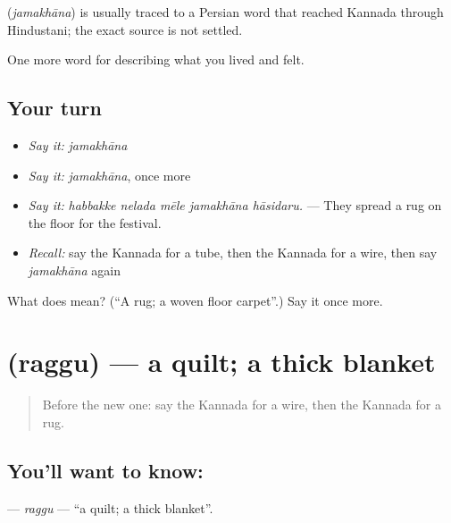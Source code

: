 \begin{cousinweb}
\textbf{} (\emph{jamakhāna}) is usually traced to a Persian word that reached Kannada through Hindustani; the exact source is not settled.
\end{cousinweb}

\begin{grammarlens}[title={What you've built}]
One more word for describing what you lived and felt.
\end{grammarlens}

\subsection*{Your turn}
\begin{itemize}
\raggedright
  \item \emph{Say it:} \emph{jamakhāna}
  \item \emph{Say it:} \emph{jamakhāna}, once more
  \item \emph{Say it:} \emph{habbakke nelada mēle jamakhāna hāsidaru.} — They spread a rug on the floor for the festival.
  \item \emph{Recall:} say the Kannada for a tube, then the Kannada for a wire, then say \emph{jamakhāna} again
\end{itemize}

\begin{tcolorbox}[breakable,colback=teal!4,colframe=teal!35!black,title={Before you move on}]
What does  mean? (\textquotedblleft{}A rug; a woven floor carpet\textquotedblright{}.) Say it once more.
\end{tcolorbox}
\section[\texorpdfstring{\kn{ರಗ್ಗು} (raggu)}{ರಗ್ಗು (raggu)}]{ (raggu) — a quilt; a thick blanket}

\label{lesson:KA-C545-raggu}



\begin{quote}
Before the new one: say the Kannada for a wire, then the Kannada for a rug.
\end{quote}

\subsection*{You'll want to know: }
\textbf{} — \emph{raggu} — \textquotedblleft{}a quilt; a thick blanket\textquotedblright{}.

